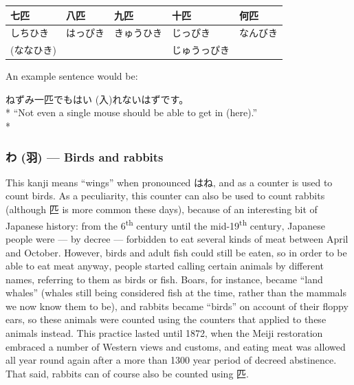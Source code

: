 \documentclass[11pt, b5paper, twoside, openright, onecolumn]{book}
\makeatletter
\newcommand*{\rubystack}[2]{{\relscale{0.5}%
  \begin{tabular}[b]{@{}c@{}}%
    {#1}\\%
   {\textscale{2}{#2}}%
  \end{tabular}}%
}
\DeclareRobustCommand*{\ruby}[2]{%
  \mbox{%
    \setlength{\parskip}{0ex}%
    \BeginAccSupp{method=pdfstringdef,ActualText={#1}}%
      \rubystack{\phantom{#2}}{#1}%
      \llap{%
        \rubystack{#2}{\phantom{#1}}%
      }%
    \EndAccSupp{}%
  }%
}
\renewcommand*{\ruby}[2]{#2 (#1)}%
\newenvironment{exampleblock}{
\setlength{\parindent}{0.6in}
\begin{minipage}[t]{\dimexpr\textwidth-\parindent}}
{\end{minipage}}
\newenvironment{mytabular}[1]{\noindent\hspace{0.4in}
\begin{tabular}[h]{#1}}{\end{tabular}}
\makeatother
\begin{document}
\smaller
\begin{mytabular}{| l  l  l  l  l |}\hline 
\rule{0pt}{2.4ex}七匹 & 八匹 & 九匹 & 十匹 & 何匹\\ 
\hline
\rule{0pt}{2.4ex}しちひき & はっぴき & きゅうひき & じっぴき & なんびき\\ 
\rule{0pt}{2.4ex}(ななひき) &  &  & じゅうっぴき & \\ 
\hline 
\end{mytabular}
\larger
\vspace{0.5cm}


An example sentence would be:

\vspace{0.4cm}
\begin{exampleblock}
ねずみ一匹でも\ruby{入}{はい}れないはずです。 \\* 
“Not even a single mouse should be able to get in (here).” \\* 
\end{exampleblock}
\subsubsection{\ruby{羽}{わ} — Birds and rabbits}


This kanji means “wings” when pronounced はね‚ and as a counter is used to count birds. As a peculiarity‚ this counter can also be used to count rabbits (although 匹 is more common these days)‚ because of an interesting bit of Japanese history: from the 6\textsuperscript{th} century until the mid-19\textsuperscript{th} century‚ Japanese people were — by decree — forbidden to eat several kinds of meat between April and October. However‚ birds and adult fish could still be eaten‚ so in order to be able to eat meat anyway‚ people started calling certain animals by different names‚ referring to them as birds or fish. Boars‚ for instance‚ became “land whales” (whales still being considered fish at the time‚ rather than the mammals we now know them to be)‚ and rabbits became “birds” on account of their floppy ears‚ so these animals were counted using the counters that applied to these animals instead. This practice lasted until 1872‚ when the Meiji restoration embraced a number of Western views and customs‚ and eating meat was allowed all year round again after a more than 1300 year period of decreed abstinence. That said‚ rabbits can of course also be counted using 匹.
\end{document}
